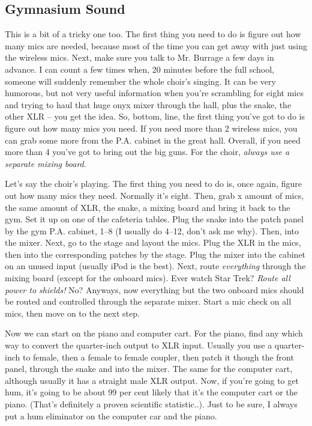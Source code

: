 \documentclass[letterpaper,10pt,oneside,headsepline]{scrreprt}
\begin{document}
\subsection{Gymnasium Sound}
This is a bit of a tricky one too. The first thing you need to do is figure out how many mics are needed, because most of the time you can get away with just using the wireless mics. Next, make sure you talk to Mr. Burrage a few days in advance. I can count a few times when, 20 minutes before the full school, someone will suddenly remember the whole choir's singing. It can be very humorous, but not very useful information when you're scrambling for eight mics and trying to haul that huge onyx mixer through the hall, plus the snake, the other XLR -- you get the idea. So, bottom, line, the first thing you've got to do is figure out how many mics you need. If you need more than 2 wireless mics, you can grab some more from the P.A. cabinet in the great hall. Overall, if you need more than 4 you've got to bring out the big guns. For the choir, \textit{always use a separate mixing board}.

Let's say the choir's playing. The first thing you need to do is, once again, figure out how many mics they need. Normally it's eight. Then, grab x amount of mics, the same amount of XLR, the snake, a mixing board and bring it back to the gym. Set it up on one of the cafeteria tables. Plug the snake into the patch panel by the gym P.A. cabinet, 1--8 (I usually do 4--12, don't ask me why). Then, into the mixer. Next, go to the stage and layout the mics. Plug the XLR in the mics, then into the corresponding patches by the stage. Plug the mixer into the cabinet on an unused input (usually iPod is the best). Next, route \textit{everything} through the mixing board (except for the onboard mics). Ever watch Star Trek? \textit{Route all power to shields!} No? Anyways, now everything but the two onboard mics should be routed and controlled through the separate mixer. Start a mic check on all mics, then move on to the next step.

Now we can start on the piano and computer cart. For the piano, find any which way to convert the quarter-inch output to XLR input. Usually you use a quarter-inch to female, then a female to female coupler, then patch it though the front panel, through the snake and into the mixer. The same for the computer cart, although usually it has a straight male XLR output. Now, if you're going to get hum, it's going to be about 99 per cent likely that it's the computer cart or the piano. (That's definitely a proven scientific statistic..). Just to be sure, I always put a hum eliminator on the computer car and the piano.
\end{document}
